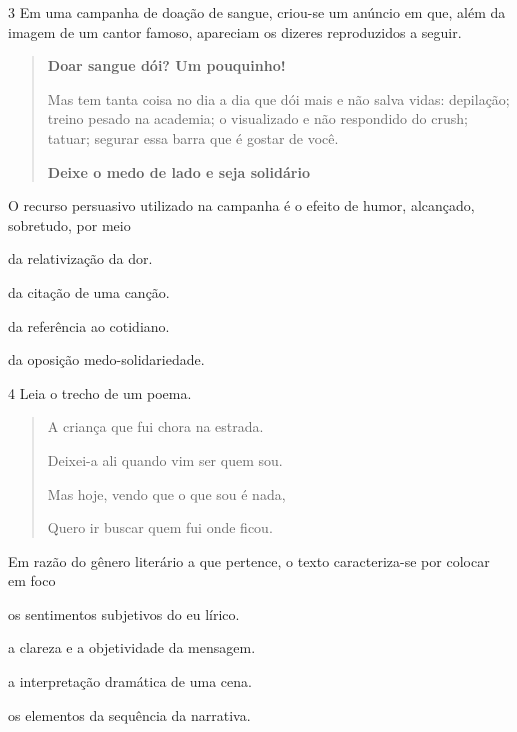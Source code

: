 \num{3} Em uma campanha de doação de sangue, criou-se um anúncio em que, além da imagem de 
um cantor famoso, apareciam os dizeres reproduzidos a seguir.

\begin{center}
\begin{quote}
\textbf{Doar sangue dói? Um pouquinho!}

Mas tem tanta coisa no dia a dia que dói mais e não salva vidas: depilação; treino pesado na academia; o 
visualizado e não respondido do crush; tatuar; segurar essa barra que é gostar de você.

\textbf{Deixe o medo de lado e seja solidário}
\end{quote}
\end{center}


O recurso persuasivo utilizado na campanha é o efeito de humor, alcançado, sobretudo, por meio

\begin{escolha}
\item da relativização da dor.
\item da citação de uma canção.
\item da referência ao cotidiano.
\item da oposição medo-solidariedade.
\end{escolha}

\num{4} Leia o trecho de um poema.

\begin{quote}
A criança que fui chora na estrada.

Deixei-a ali quando vim ser quem sou.

Mas hoje, vendo que o que sou é nada,

Quero ir buscar quem fui onde ficou.

\end{quote}

Em razão do gênero literário a que pertence, o texto caracteriza-se por
colocar em foco

\begin{escolha}
\item os sentimentos subjetivos do eu lírico.

\item a clareza e a objetividade da mensagem.

\item a interpretação dramática de uma cena.

\item os elementos da sequência da narrativa.
\end{escolha}

